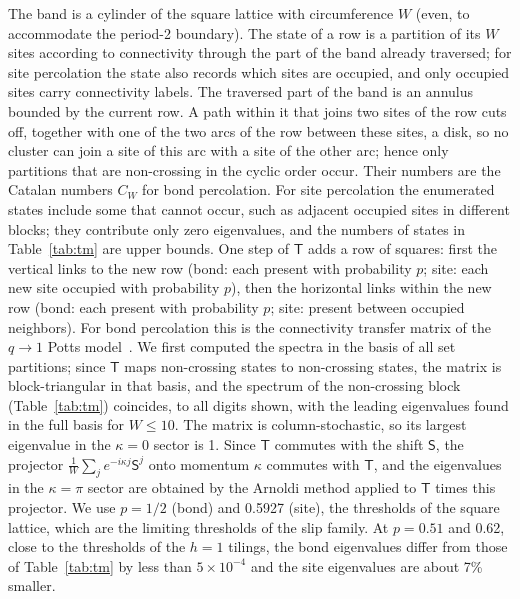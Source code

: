 \documentclass[pre,twocolumn,superscriptaddress,longbibliography,floatfix]{revtex4-2}
\begin{document}
The band is a cylinder of the square lattice with circumference $W$ (even, to accommodate the period-2 boundary). The state of a row is a partition of its $W$ sites according to connectivity through the part of the band already traversed; for site percolation the state also records which sites are occupied, and only occupied sites carry connectivity labels. The traversed part of the band is an annulus bounded by the current row. A path within it that joins two sites of the row cuts off, together with one of the two arcs of the row between these sites, a disk, so no cluster can join a site of this arc with a site of the other arc; hence only partitions that are non-crossing in the cyclic order occur. Their numbers are the Catalan numbers $C_W$ for bond percolation. For site percolation the enumerated states include some that cannot occur, such as adjacent occupied sites in different blocks; they contribute only zero eigenvalues, and the numbers of states in Table~\ref{tab:tm} are upper bounds. One step of $\mathsf T$ adds a row of squares: first the vertical links to the new row (bond: each present with probability $p$; site: each new site occupied with probability $p$), then the horizontal links within the new row (bond: each present with probability $p$; site: present between occupied neighbors). For bond percolation this is the connectivity transfer matrix of the $q\to1$ Potts model~\cite{TemperleyLieb71,JacobsenScullard13}. We first computed the spectra in the basis of all set partitions; since $\mathsf T$ maps non-crossing states to non-crossing states, the matrix is block-triangular in that basis, and the spectrum of the non-crossing block (Table~\ref{tab:tm}) coincides, to all digits shown, with the leading eigenvalues found in the full basis for $W\le10$. The matrix is column-stochastic, so its largest eigenvalue in the $\kappa=0$ sector is 1. Since $\mathsf T$ commutes with the shift $\mathsf S$, the projector $\frac1W\sum_j e^{-i\kappa j}\mathsf S^j$ onto momentum $\kappa$ commutes with $\mathsf T$, and the eigenvalues in the $\kappa=\pi$ sector are obtained by the Arnoldi method applied to $\mathsf T$ times this projector. We use $p=1/2$ (bond) and 0.5927 (site), the thresholds of the square lattice, which are the limiting thresholds of the slip family. At $p=0.51$ and 0.62, close to the thresholds of the $h=1$ tilings, the bond eigenvalues differ from those of Table~\ref{tab:tm} by less than $5\times10^{-4}$ and the site eigenvalues are about 7\% smaller.

\end{document}
